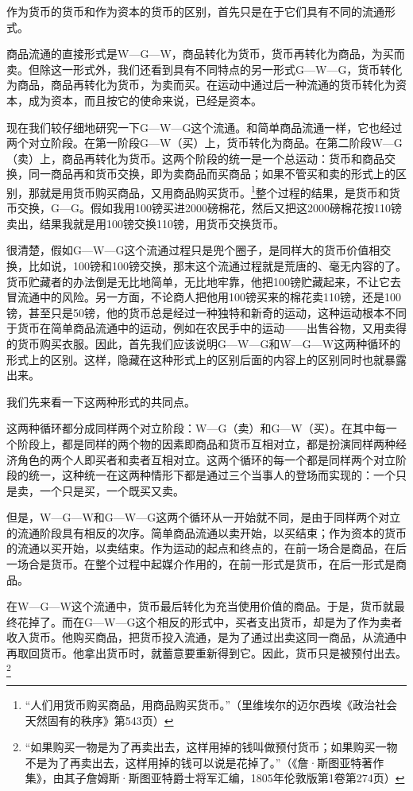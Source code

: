 \documentclass{ctexbook}
\begin{document}
    作为货币的货币和作为资本的货币的区别，首先只是在于它们具有不同的流通形式。

    商品流通的直接形式是W—G—W，商品转化为货币，货币再转化为商品，为买而卖。但除这一形式外，我们还看到具有不同特点的另一形式G—W—G，货币转化为商品，商品再转化为货币，为卖而买。在运动中通过后一种流通的货币转化为资本，成为资本，而且按它的使命来说，已经是资本。

    现在我们较仔细地研究一下G—W—G这个流通。和简单商品流通一样，它也经过两个对立阶段。在第一阶段G—W（买）上，货币转化为商品。在第二阶段W—G（卖）上，商品再转化为货币。这两个阶段的统一是一个总运动：货币和商品交换，同一商品再和货币交换，即为卖商品而买商品；如果不管买和卖的形式上的区别，那就是用货币购买商品，又用商品购买货币。\footnote{“人们用货币购买商品，用商品购买货币。”（里维埃尔的迈尔西埃《政治社会天然固有的秩序》第543页）}整个过程的结果，是货币和货币交换，G—G。假如我用100镑买进2000磅棉花，然后又把这2000磅棉花按110镑卖出，结果我就是用100镑交换110镑，用货币交换货币。

    很清楚，假如G—W—G这个流通过程只是兜个圈子，是同样大的货币价值相交换，比如说，100镑和100镑交换，那末这个流通过程就是荒唐的、毫无内容的了。货币贮藏者的办法倒是无比地简单，无比地牢靠，他把100镑贮藏起来，不让它去冒流通中的风险。另一方面，不论商人把他用100镑买来的棉花卖110镑，还是100镑，甚至只是50镑，他的货币总是经过一种独特和新奇的运动，这种运动根本不同于货币在简单商品流通中的运动，例如在农民手中的运动——出售谷物，又用卖得的货币购买衣服。因此，首先我们应该说明G—W—G和W—G—W这两种循环的形式上的区别。这样，隐藏在这种形式上的区别后面的内容上的区别同时也就暴露出来。

    我们先来看一下这两种形式的共同点。

    这两种循环都分成同样两个对立阶段：W—G（卖）和G—W（买）。在其中每一个阶段上，都是同样的两个物的因素即商品和货币互相对立，都是扮演同样两种经济角色的两个人即买者和卖者互相对立。这两个循环的每一个都是同样两个对立阶段的统一，这种统一在这两种情形下都是通过三个当事人的登场而实现的：一个只是卖，一个只是买，一个既买又卖。

    但是，W—G—W和G—W—G这两个循环从一开始就不同，是由于同样两个对立的流通阶段具有相反的次序。简单商品流通以卖开始，以买结束；作为资本的货币的流通以买开始，以卖结束。作为运动的起点和终点的，在前一场合是商品，在后一场合是货币。在整个过程中起媒介作用的，在前一形式是货币，在后一形式是商品。

    在W—G—W这个流通中，货币最后转化为充当使用价值的商品。于是，货币就最终花掉了。而在G—W—G这个相反的形式中，买者支出货币，却是为了作为卖者收入货币。他购买商品，把货币投入流通，是为了通过出卖这同一商品，从流通中再取回货币。他拿出货币时，就蓄意要重新得到它。因此，货币只是被预付出去。\footnote{“如果购买一物是为了再卖出去，这样用掉的钱叫做预付货币；如果购买一物不是为了再卖出去，这样用掉的钱可以说是花掉了。”（《詹·斯图亚特著作集》，由其子詹姆斯·斯图亚特爵士将军汇编，1805年伦敦版第1卷第274页）}
\end{document}
